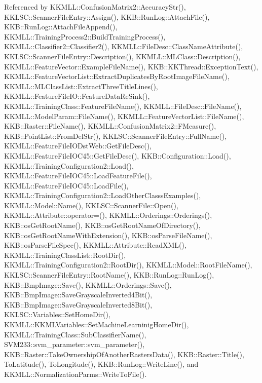 Referenced by K\+K\+M\+L\+L\+::\+Confusion\+Matrix2\+::\+Accuracy\+Str(), K\+K\+L\+S\+C\+::\+Scanner\+File\+Entry\+::\+Assign(), K\+K\+B\+::\+Run\+Log\+::\+Attach\+File(), K\+K\+B\+::\+Run\+Log\+::\+Attach\+File\+Append(), K\+K\+M\+L\+L\+::\+Training\+Process2\+::\+Build\+Training\+Process(), K\+K\+M\+L\+L\+::\+Classifier2\+::\+Classifier2(), K\+K\+M\+L\+L\+::\+File\+Desc\+::\+Class\+Name\+Attribute(), K\+K\+L\+S\+C\+::\+Scanner\+File\+Entry\+::\+Description(), K\+K\+M\+L\+L\+::\+M\+L\+Class\+::\+Description(), K\+K\+M\+L\+L\+::\+Feature\+Vector\+::\+Example\+File\+Name(), K\+K\+B\+::\+K\+K\+Thread\+::\+Exception\+Text(), K\+K\+M\+L\+L\+::\+Feature\+Vector\+List\+::\+Extract\+Duplicates\+By\+Root\+Image\+File\+Name(), K\+K\+M\+L\+L\+::\+M\+L\+Class\+List\+::\+Extract\+Three\+Title\+Lines(), K\+K\+M\+L\+L\+::\+Feature\+File\+I\+O\+::\+Feature\+Data\+Re\+Sink(), K\+K\+M\+L\+L\+::\+Training\+Class\+::\+Feature\+File\+Name(), K\+K\+M\+L\+L\+::\+File\+Desc\+::\+File\+Name(), K\+K\+M\+L\+L\+::\+Model\+Param\+::\+File\+Name(), K\+K\+M\+L\+L\+::\+Feature\+Vector\+List\+::\+File\+Name(), K\+K\+B\+::\+Raster\+::\+File\+Name(), K\+K\+M\+L\+L\+::\+Confusion\+Matrix2\+::\+F\+Measure(), K\+K\+B\+::\+Point\+List\+::\+From\+Del\+Str(), K\+K\+L\+S\+C\+::\+Scanner\+File\+Entry\+::\+Full\+Name(), K\+K\+M\+L\+L\+::\+Feature\+File\+I\+O\+Dst\+Web\+::\+Get\+File\+Desc(), K\+K\+M\+L\+L\+::\+Feature\+File\+I\+O\+C45\+::\+Get\+File\+Desc(), K\+K\+B\+::\+Configuration\+::\+Load(), K\+K\+M\+L\+L\+::\+Training\+Configuration2\+::\+Load(), K\+K\+M\+L\+L\+::\+Feature\+File\+I\+O\+C45\+::\+Load\+Feature\+File(), K\+K\+M\+L\+L\+::\+Feature\+File\+I\+O\+C45\+::\+Load\+File(), K\+K\+M\+L\+L\+::\+Training\+Configuration2\+::\+Load\+Other\+Classs\+Examples(), K\+K\+M\+L\+L\+::\+Model\+::\+Name(), K\+K\+L\+S\+C\+::\+Scanner\+File\+::\+Open(), K\+K\+M\+L\+L\+::\+Attribute\+::operator=(), K\+K\+M\+L\+L\+::\+Orderings\+::\+Orderings(), K\+K\+B\+::os\+Get\+Root\+Name(), K\+K\+B\+::os\+Get\+Root\+Name\+Of\+Directory(), K\+K\+B\+::os\+Get\+Root\+Name\+With\+Extension(), K\+K\+B\+::os\+Parse\+File\+Name(), K\+K\+B\+::os\+Parse\+File\+Spec(), K\+K\+M\+L\+L\+::\+Attribute\+::\+Read\+X\+M\+L(), K\+K\+M\+L\+L\+::\+Training\+Class\+List\+::\+Root\+Dir(), K\+K\+M\+L\+L\+::\+Training\+Configuration2\+::\+Root\+Dir(), K\+K\+M\+L\+L\+::\+Model\+::\+Root\+File\+Name(), K\+K\+L\+S\+C\+::\+Scanner\+File\+Entry\+::\+Root\+Name(), K\+K\+B\+::\+Run\+Log\+::\+Run\+Log(), K\+K\+B\+::\+Bmp\+Image\+::\+Save(), K\+K\+M\+L\+L\+::\+Orderings\+::\+Save(), K\+K\+B\+::\+Bmp\+Image\+::\+Save\+Grayscale\+Inverted4\+Bit(), K\+K\+B\+::\+Bmp\+Image\+::\+Save\+Grayscale\+Inverted8\+Bit(), K\+K\+L\+S\+C\+::\+Variables\+::\+Set\+Home\+Dir(), K\+K\+M\+L\+L\+::\+K\+K\+M\+L\+Variables\+::\+Set\+Machine\+Learninig\+Home\+Dir(), K\+K\+M\+L\+L\+::\+Training\+Class\+::\+Sub\+Classifier\+Name(), S\+V\+M233\+::svm\+\_\+parameter\+::svm\+\_\+parameter(), K\+K\+B\+::\+Raster\+::\+Take\+Ownership\+Of\+Another\+Rasters\+Data(), K\+K\+B\+::\+Raster\+::\+Title(), To\+Latitude(), To\+Longitude(), K\+K\+B\+::\+Run\+Log\+::\+Write\+Line(), and K\+K\+M\+L\+L\+::\+Normalization\+Parms\+::\+Write\+To\+File().


